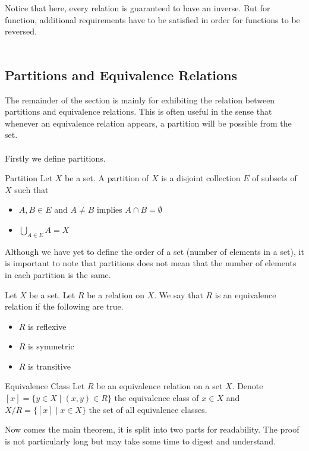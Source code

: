 \documentclass[a4paper]{article}
\begin{document}
Notice that here, every relation is guaranteed to have an inverse. But for function, additional requirements have to be satisfied in order for functions to be reversed. \\~\\

\subsection{Partitions and Equivalence Relations}
The remainder of the section is mainly for exhibiting the relation between partitions and equivalence relations. This is often useful in the sense that whenever an equivalence relation appears, a partition will be possible from the set. \\~\\
Firstly we define partitions. 

\begin{defn}{Partition}{} Let $X$ be a set. A partition of $X$ is a disjoint collection $E$ of subsets of $X$ such that
\begin{itemize}
\item $A,B\in E$ and $A\neq B$ implies $A\cap B=\emptyset$
\item $\bigcup_{A\in E}A=X$
\end{itemize}
\end{defn}

Although we have yet to define the order of a set (number of elements in a set), it is important to note that partitions does not mean that the number of elements in each partition is the same. 

\begin{defn}{}{} Let $X$ be a set. Let $R$ be a relation on $X$. We say that $R$ is an equivalence relation if the following are true. 
\begin{itemize}
\item $R$ is reflexive
\item $R$ is symmetric
\item $R$ is transitive
\end{itemize}
\end{defn}

\begin{defn}{Equivalence Class}{} Let $R$ be an equivalence relation on a set $X$. Denote $[x]=\{y\in X\;|\;(x,y)\in R\}$ the equivalence class of $x\in X$ and $X/R=\{[x]\;|\;x\in X\}$ the set of all equivalence classes. 
\end{defn}

Now comes the main theorem, it is split into two parts for readability. The proof is not particularly long but may take some time to digest and understand. 
\end{document}
